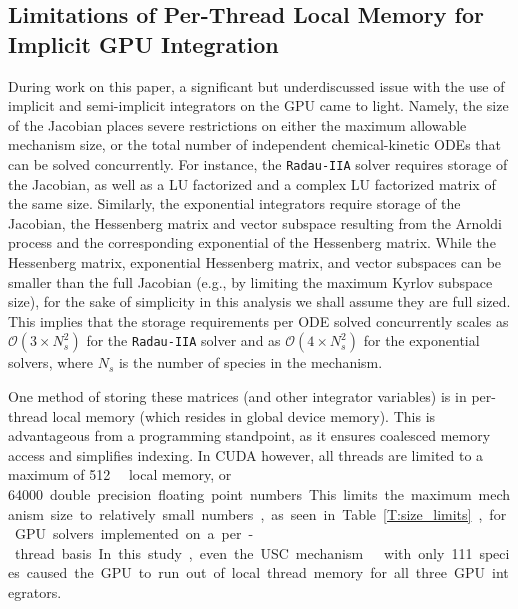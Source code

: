 \documentclass[preprint]{elsarticle}
\begin{document}
\subsection{Limitations of Per-Thread Local Memory for Implicit GPU Integration}
During work on this paper, a significant but underdiscussed issue with the use of implicit and semi-implicit integrators on the GPU came to light.
Namely, the size of the Jacobian places severe restrictions on either the maximum allowable mechanism size, or the total number of independent chemical-kinetic ODEs that can be solved concurrently.
For instance, the \texttt{Radau-IIA} solver requires storage of the Jacobian, as well as a LU factorized and a complex LU factorized matrix of the same size.
Similarly, the exponential integrators require storage of the Jacobian, the Hessenberg matrix and vector subspace resulting from the Arnoldi process and the corresponding exponential of the Hessenberg matrix.
While the Hessenberg matrix, exponential Hessenberg matrix, and vector subspaces can be smaller than the full Jacobian (e.g., by limiting the maximum Kyrlov subspace size), for the sake of simplicity in this analysis we shall assume they are full sized.
This implies that the storage requirements per ODE solved concurrently scales as $\mathcal{O}\left(3 \times N_s^2\right)$ for the \texttt{Radau-IIA} solver and as $\mathcal{O}\left(4 \times N_s^2\right)$ for the exponential solvers, where $N_s$ is the number of species in the mechanism.

One method of storing these matrices (and other integrator variables) is in per-thread local memory (which resides in global device memory).
This is advantageous from a programming standpoint, as it ensures coalesced memory access and simplifies indexing.
In CUDA however, all threads are limited to a maximum of \SI{512}{\kilo\byte} local memory, or \SI{64000} double precision floating point numbers.
This limits the maximum mechanism size to relatively small numbers, as seen in Table~\ref{T:size_limits}, for GPU solvers implemented on a per-thread basis.
In this study, even the USC mechanism ~\cite{Wang:2007} with only 111 species caused the GPU to run out of local thread memory for all three GPU integrators.
\end{document}
